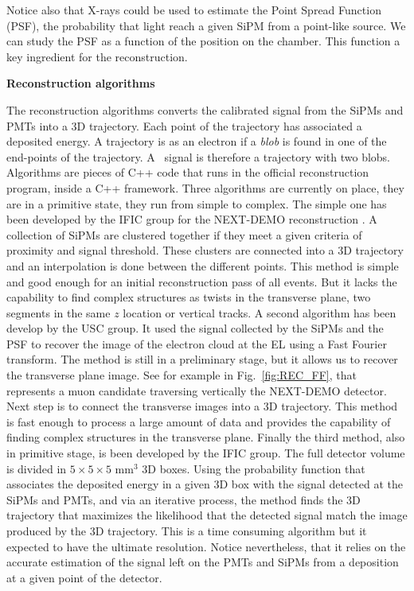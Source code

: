 Notice also that X-rays could be used to estimate the Point Spread Function (PSF), the probability that light reach a given SiPM from a point-like source. We can study the PSF as a function of the position on the chamber. 
This function a key ingredient for the reconstruction. 
 
{\bf Reconstruction algorithms}

The reconstruction algorithms converts the calibrated signal from the SiPMs and PMTs into a 3D trajectory. Each point of the trajectory has associated a deposited energy. 
A trajectory is as an electron if a {\it blob} is found in one of the end-points of the trajectory. 
A \bb ~signal is therefore a trajectory with two blobs.
Algorithms are pieces of C++ code that runs in the official reconstruction program, inside a C++ framework.
Three algorithms are currently on place, they are in a primitive state, they run from simple to complex.
The simple one has been developed by the IFIC group for the NEXT-DEMO reconstruction \cite{NEXT-DEMO2}. A collection of SiPMs are clustered together if they meet a given criteria of proximity and signal threshold. These clusters are connected into a 3D trajectory and an interpolation is done between the different points. This method is simple and good enough for an initial reconstruction pass of all events. But it lacks the capability to find complex structures as twists in the transverse plane, two segments in the same $z$ location or vertical tracks. 
A second algorithm has been develop by the USC group. It used the signal collected by the SiPMs and the PSF to recover the image of the electron cloud at the EL using a Fast Fourier transform. The method is still in a preliminary stage, but it allows us to recover the transverse plane image. See for example in Fig.~\ref{fig:REC_FF}, that represents a muon candidate traversing vertically the NEXT-DEMO detector. Next step is to connect the transverse images into a 3D trajectory. This method is fast enough to process a large amount of data and provides the capability of finding complex structures in the transverse plane. 
Finally the third method, also in primitive stage, is been developed by the IFIC group. The full detector volume is divided in $5\times5\times5$ mm$^3$ 3D boxes. Using the probability function that associates the deposited energy in a given 3D box with the signal detected at the SiPMs and PMTs, and via an iterative process, the method finds the 3D trajectory that maximizes the likelihood that the detected signal match the image produced by the 3D trajectory. This is a time consuming algorithm but it expected to have the ultimate resolution. Notice nevertheless, that it relies on the accurate estimation of the signal left on the PMTs and SiPMs from a deposition at a given point of the detector. 

